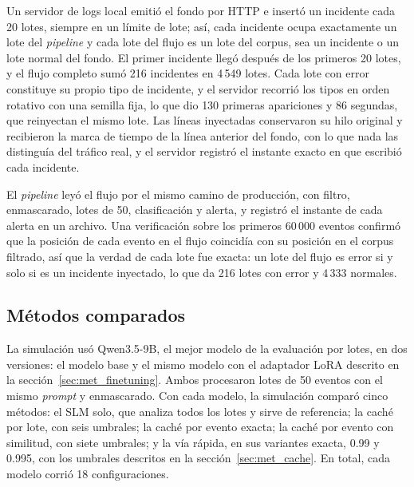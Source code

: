 Un servidor de logs local emitió el fondo por HTTP e insertó un incidente cada 20 lotes, siempre en un límite de lote; así, cada incidente ocupa exactamente un lote del \textit{pipeline} y cada lote del flujo es un lote del corpus, sea un incidente o un lote normal del fondo. El primer incidente llegó después de los primeros 20 lotes, y el flujo completo sumó 216 incidentes en 4\,549 lotes. Cada lote con error constituye su propio tipo de incidente, y el servidor recorrió los tipos en orden rotativo con una semilla fija, lo que dio 130 primeras apariciones y 86 segundas, que reinyectan el mismo lote. Las líneas inyectadas conservaron su hilo original y recibieron la marca de tiempo de la línea anterior del fondo, con lo que nada las distinguía del tráfico real, y el servidor registró el instante exacto en que escribió cada incidente.

El \textit{pipeline} leyó el flujo por el mismo camino de producción, con filtro, enmascarado, lotes de 50, clasificación y alerta, y registró el instante de cada alerta en un archivo. Una verificación sobre los primeros 60\,000 eventos confirmó que la posición de cada evento en el flujo coincidía con su posición en el corpus filtrado, así que la verdad de cada lote fue exacta: un lote del flujo es error si y solo si es un incidente inyectado, lo que da 216 lotes con error y 4\,333 normales.

\subsection{Métodos comparados}

La simulación usó Qwen3.5-9B, el mejor modelo de la evaluación por lotes, en dos versiones: el modelo base y el mismo modelo con el adaptador LoRA descrito en la sección~\ref{sec:met_finetuning}. Ambos procesaron lotes de 50 eventos con el mismo \textit{prompt} y enmascarado. Con cada modelo, la simulación comparó cinco métodos: el SLM solo, que analiza todos los lotes y sirve de referencia; la caché por lote, con seis umbrales; la caché por evento exacta; la caché por evento con similitud, con siete umbrales; y la vía rápida, en sus variantes exacta, 0.99 y 0.995, con los umbrales descritos en la sección~\ref{sec:met_cache}. En total, cada modelo corrió 18 configuraciones.

